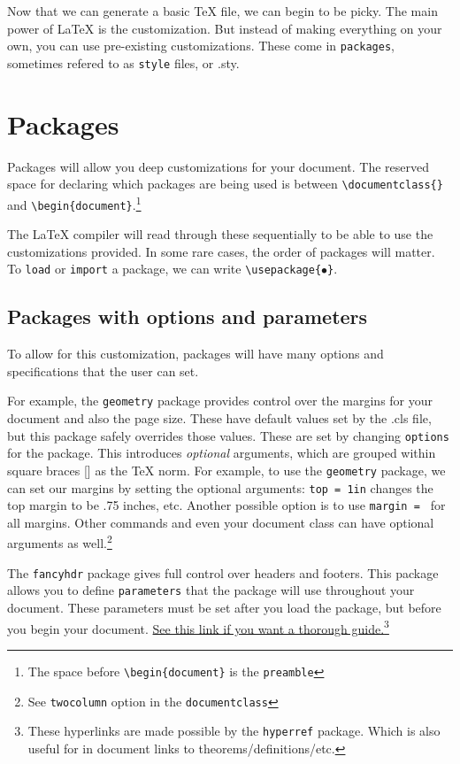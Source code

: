 \documentclass[twocolumn]{article}
\begin{document}
Now that we can generate a basic TeX file, we can begin to be picky. The main power of LaTeX is the customization. But instead of making everything on your own, you can use pre-existing customizations. These come in \verb|packages|, sometimes refered to as \verb|style| files, or .sty.

\section{Packages}\label{sec:packages}
Packages will allow you deep customizations for your document. The reserved space for declaring which packages are being used is between \verb|\documentclass{}| and \verb|\begin{document}|.\footnote{The space before \texttt{\textbackslash begin\{document\}} is the \texttt{preamble}}

The LaTeX compiler will read through these sequentially to be able to use the customizations provided. In some rare cases, the order of packages will matter. To \verb|load| or \verb|import| a package, we can write \verb|\usepackage{|$\bullet$\verb|}|.

\subsection{Packages with options and parameters}
To allow for this customization, packages will have many options and specifications that the user can set.

For example, the \verb|geometry| package provides control over the margins for your document and also the page size. These have default values set by the .cls file, but this package safely overrides those values. These are set by changing \verb|options| for the package. This introduces \textit{optional} arguments, which are grouped within square braces [] as the TeX norm. For example, to use the \verb|geometry| package, we can set our margins by setting the optional arguments: \verb|top = 1in| changes the top margin to be .75 inches, etc. Another possible option is to use \verb|margin = | for all margins. Other commands and even your document class can have optional arguments as well.\footnote{See \texttt{twocolumn} option in the \texttt{documentclass}}

The \verb|fancyhdr| package gives full control over headers and footers. This package allows you to define \verb|parameters| that the package will use throughout your document. These parameters must be set after you load the package, but before you begin your document. 
\href{https://www.overleaf.com/learn/latex/Headers_and_footers#LaTeX_document_classes}{See this link if you want a thorough guide.}\footnote{These hyperlinks are made possible by the \texttt{hyperref} package. Which is also useful for in document links to theorems/definitions/etc.}
\end{document}
